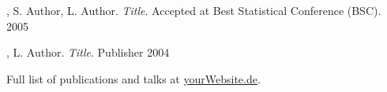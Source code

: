 
\begin{cvpubs}

  \cvpub
    {}
    {, S. Author, L. Author. \textit{Title}. Accepted at Best Statistical Conference (BSC).}
    {2005}
    
    \cvpub
    {}
    {, L. Author. \textit{Title}. Publisher}
    {2004}

\end{cvpubs}

\vspace{0.2em}
\begin{cvparagraph}
Full list of publications and talks at \href{https://yourWebsite.de}{yourWebsite.de}.
\end{cvparagraph}
